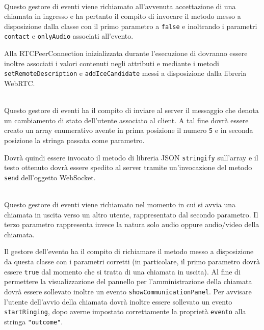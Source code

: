 \begin{description}
  \item{}\\
  Questo gestore di eventi viene richiamato all'avvenuta accettazione di una chiamata in ingresso e ha pertanto il compito di invocare il metodo  messo a disposizione dalla classe con il primo parametro a \verb'false' e inoltrando i parametri \verb'contact' e \verb'onlyAudio' associati all'evento.
  
  Alla RTCPeerConnection inizializzata durante l'esecuzione di  dovranno essere inoltre associati i valori contenuti negli attributi  e  mediante i metodi \verb'setRemoteDescription' e \verb'addIceCandidate' messi a disposizione dalla libreria WebRTC.
  
  \item{}\\
  Questo gestore di eventi ha il compito di inviare al server il messaggio che denota un cambiamento di stato dell'utente associato al client. A tal fine dovrà essere creato un array enumerativo avente in prima posizione il numero \verb'5' e in seconda posizione la stringa passata come parametro.
  
  Dovrà quindi essere invocato il metodo di libreria JSON \verb'stringify' sull'array e il testo ottenuto dovrà essere spedito al server tramite un'invocazione del metodo \verb'send' dell'oggetto WebSocket.
  
  \item{}\\
  Questo gestore di eventi viene richiamato nel momento in cui si avvia una chiamata in uscita verso un altro utente, rappresentato dal secondo parametro. Il terzo parametro rappresenta invece la natura solo audio oppure audio/video della chiamata.
  
  Il gestore dell'evento ha il compito di richiamare il metodo  messo a disposizione da questa classe con i parametri corretti (in particolare, il primo parametro dovrà essere \verb'true' dal momento che si tratta di una chiamata in uscita). Al fine di permettere la visualizzazione del pannello per l'amministrazione della chiamata dovrà essere sollevato inoltre un evento \verb'showCommunicationPanel'. Per avvisare l'utente dell'avvio della chiamata dovrà inoltre essere sollevato un evento \verb'startRinging', dopo averne impostato correttamente la proprietà \verb'evento' alla stringa \verb'"outcome"'.
  

\end{description}
